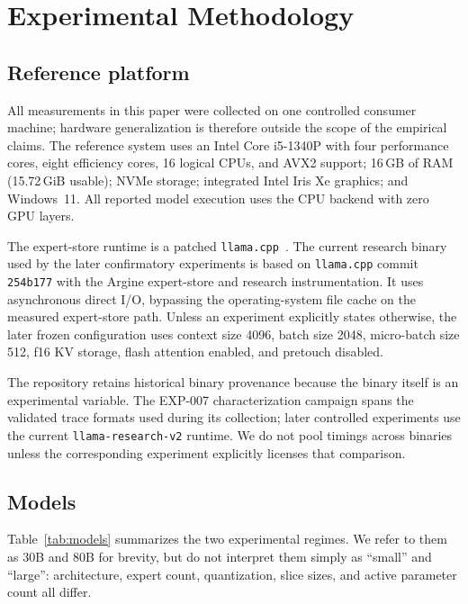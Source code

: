\section{Experimental Methodology}
\label{sec:methodology}

\subsection{Reference platform}

All measurements in this paper were collected on one controlled consumer machine; hardware generalization is therefore outside the scope of the empirical claims. The reference system uses an Intel Core i5-1340P with four performance cores, eight efficiency cores, 16 logical CPUs, and AVX2 support; 16\,GB of RAM (15.72\,GiB usable); NVMe storage; integrated Intel Iris Xe graphics; and Windows~11. All reported model execution uses the CPU backend with zero GPU layers.

The expert-store runtime is a patched \texttt{llama.cpp}~\cite{gerganov2023llamacpp}. The current research binary used by the later confirmatory experiments is based on \texttt{llama.cpp} commit \texttt{254b177} with the Argine expert-store and research instrumentation. It uses asynchronous direct I/O, bypassing the operating-system file cache on the measured expert-store path. Unless an experiment explicitly states otherwise, the later frozen configuration uses context size 4096, batch size 2048, micro-batch size 512, f16 KV storage, flash attention enabled, and pretouch disabled.

The repository retains historical binary provenance because the binary itself is an experimental variable. The EXP-007 characterization campaign spans the validated trace formats used during its collection; later controlled experiments use the current \texttt{llama-research-v2} runtime. We do not pool timings across binaries unless the corresponding experiment explicitly licenses that comparison.

\subsection{Models}

Table~\ref{tab:models} summarizes the two experimental regimes. We refer to them as 30B and 80B for brevity, but do not interpret them simply as ``small'' and ``large'': architecture, expert count, quantization, slice sizes, and active parameter count all differ.

